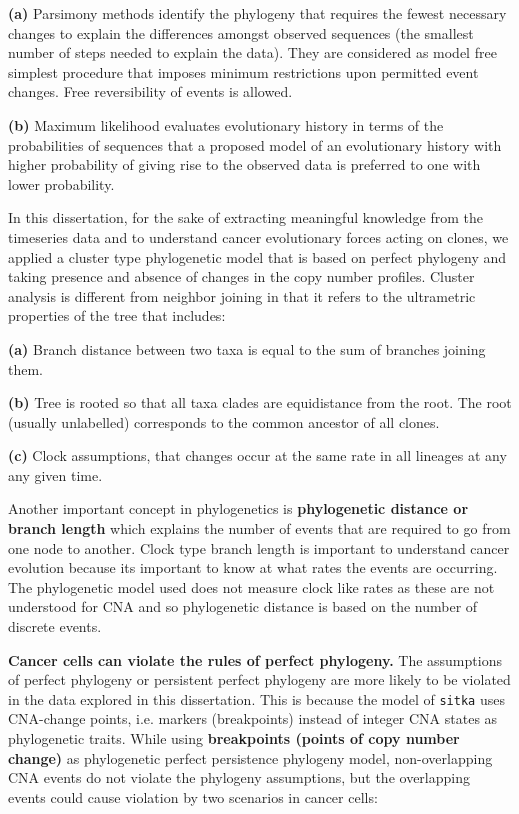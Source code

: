 \textbf{(a)} Parsimony methods identify the phylogeny that requires the fewest necessary changes to explain the differences amongst observed sequences (the smallest number of steps needed to explain the data). They are considered as model free simplest procedure that imposes minimum restrictions upon permitted event changes. Free reversibility of events is allowed.

\textbf{(b)} Maximum likelihood evaluates evolutionary history in terms of the probabilities of sequences that a proposed model of an evolutionary history with higher probability of giving rise to the observed data is preferred to one with lower probability. 


In this dissertation, for the sake of extracting meaningful knowledge from the timeseries data and to understand cancer evolutionary forces acting on clones, we applied a cluster type phylogenetic model that is based on perfect phylogeny and taking presence and absence of changes in the copy number profiles. 
Cluster analysis is different from neighbor joining in that it refers to the ultrametric properties of the tree that includes:

 \textbf{(a)} Branch distance between two taxa is equal to the sum of branches joining them.

\textbf{(b)} Tree is rooted so that all taxa clades are equidistance from the root. The root (usually unlabelled) corresponds to the common ancestor of all clones.

\textbf{(c)} Clock assumptions, that changes occur at the same rate in all lineages at any any given time.

Another important concept in phylogenetics is \textbf{phylogenetic distance or branch length} which explains the number of events that are required to go from one node to another. Clock type branch length is important to understand cancer evolution because its important to know at what rates the events are occurring. The phylogenetic model used does not measure clock like rates as these are not understood for CNA and so phylogenetic distance is based on the number of discrete events.

\textbf{Cancer cells can violate the rules of perfect phylogeny.}
The assumptions of perfect phylogeny or persistent perfect phylogeny are more likely to be violated in the data explored in this dissertation. This is because the model of \texttt{sitka} \cite{dorri2020efficient} uses 
 CNA-change points, i.e. markers (breakpoints) instead of integer CNA states as phylogenetic traits. 
While using \textbf{breakpoints (points of copy number change)} as phylogenetic perfect persistence phylogeny model, non-overlapping CNA events do not violate the phylogeny assumptions, but the overlapping events could cause violation by two scenarios in cancer cells:

